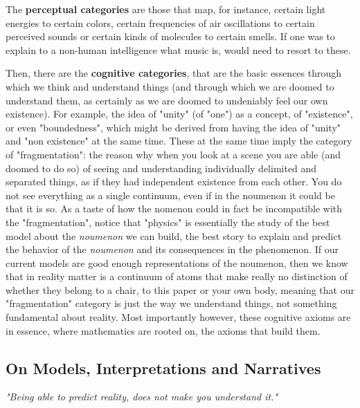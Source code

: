 \documentclass[11pt, a4paper]{article} %
\begin{document}
The \textbf{perceptual categories} are those that map, for instance, certain light energies to certain colors, certain frequencies of air oscillations to certain perceived sounds or certain kinds of molecules to certain smells. If one was to explain to a non-human intelligence what music is, would need to resort to these.\vspace{-0.1cm}

Then, there are the \textbf{cognitive categories}, that are the basic essences through which we think and understand things (and through which we are doomed to understand them, as certainly as we are doomed to undeniably feel our own existence). For example, the idea of "unity" (of "one") as a concept, of "existence", or even "boundedness", which might be derived from having the idea of "unity" and "non existence" at the same time. These at the same time imply the category of "fragmentation": the reason why when you look at a scene you are able (and doomed to do so) of seeing and understanding individually delimited and separated things, as if they had independent existence from each other. You do not see everything as a single continuum, even if in the noumenon it could be that it is so. As a taste of how the nomenon could in fact be incompatible with the "fragmentation", notice that "physics" is essentially the study of the best model about the {\em noumenon} we can build, the best story to explain and predict the behavior of the {\em noumenon} and its consequences in the phenomenon. If our current models are good enough representations of the noumenon, then we know that in reality matter is a continuum of atoms that make really no distinction of whether they belong to a chair, to this paper or your own body, meaning that our "fragmentation" category is just the way we understand things, not something fundamental about reality. Most importantly however, these cognitive axioms are in essence, where mathematics are rooted on, the axioms that build them.

\subsection*{On Models, Interpretations and Narratives}
\begin{flushright} \em "Being able to predict reality, does not make you understand it."
\end{flushright}
\end{document}
